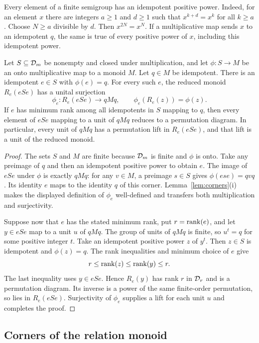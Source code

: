 Every element of a finite semigroup has an idempotent positive power.
Indeed, for an element $x$ there are integers $a\geq1$ and $d\geq1$
such that $x^{k+d}=x^k$ for all $k\geq a$.  Choose $N\geq a$
divisible by $d$.  Then $x^{2N}=x^N$.  If a multiplicative map sends
$x$ to an idempotent $q$, the same is true of every positive power of
$x$, including this idempotent power.

\begin{lemma}
\label{lem:unit-lifts}
Let $S\subseteq\mathcal D_{m}$ be nonempty and closed under multiplication,
and let $\phi:S\to M$ be an onto multiplicative map to a monoid $M$.
Let $q\in M$ be idempotent.
There is an idempotent $e\in S$ with $\phi(e)=q$.  For every such
$e$, the reduced monoid $R_e(eSe)$ has a unital surjection
\[
  \phi_e:R_e(eSe)\longrightarrow qMq,
  \qquad \phi_e(R_e(z))=\phi(z).
\]
If $e$ has minimum rank among all idempotents in $S$ mapping to $q$,
then every element of $eSe$ mapping to a unit of $qMq$ reduces to a
permutation diagram.  In particular, every unit of $qMq$ has a
permutation lift in $R_e(eSe)$, and that lift is a unit of the reduced
monoid.
\end{lemma}

\begin{proof}
The sets $S$ and $M$ are finite because $\mathcal D_{m}$ is finite and $\phi$
is onto.  Take any preimage of $q$ and then an idempotent positive power
to obtain $e$.  The image of $eSe$ under $\phi$ is exactly $qMq$:
for any $v\in M$, a preimage $s\in S$ gives
$\phi(ese)=qvq$.  Its identity $e$ maps to the identity $q$ of this
corner.  Lemma~\ref{lem:corners}(i) makes the displayed definition of
$\phi_e$ well-defined and transfers both multiplication and surjectivity.

Suppose now that $e$ has the stated minimum rank, put $r=\operatorname{rank}(e)$,
and let $y\in eSe$ map to a unit $u$ of $qMq$.  The group of units
of $qMq$ is finite, so $u^t=q$ for some positive integer $t$.
Take an idempotent positive power $z$ of $y^t$.  Then $z\in S$ is
idempotent and $\phi(z)=q$.  The rank inequalities and minimum choice
of $e$ give
\[
  r\leq\operatorname{rank}(z)\leq\operatorname{rank}(y)\leq r.
\]
The last inequality uses $y\in eSe$.  Hence $R_e(y)$ has rank $r$
in $\mathcal D_{r}$ and is a permutation diagram.  Its inverse is a power of
the same finite-order permutation, so lies in $R_e(eSe)$.  Surjectivity
of $\phi_e$ supplies a lift for each unit $u$ and completes the proof.
\end{proof}

\subsection{Corners of the relation monoid}

